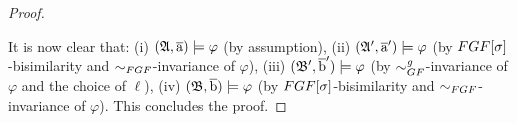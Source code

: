 \begin{proof}
\begin{figure}[H]
  \label{fig:fgf-to-gf-upgrade}
\end{figure}

It is now clear that: 
(i) $({\mathfrak{A}}, \overline{\mathrm{a}}) \models \varphi$ (by assumption),
(ii) $({\mathfrak{A}}', \overline{\mathrm{a}}') \models \varphi$ (by $\FGF[\sigma]$-bisimilarity and $\bisimto_{\FGF}$-invariance of $\varphi$),
(iii) $({\mathfrak{B}}', \overline{\mathrm{b}}') \models \varphi$ (by $\bisimto_{\GF}^{\mathit{g}}$-invariance of $\varphi$ and the choice of $\ell$),
(iv) $({\mathfrak{B}}, \overline{\mathrm{b}}) \models \varphi$ (by $\FGF[\sigma]$-bisimilarity and $\bisimto_{\FGF}$-invariance of $\varphi$). 
This concludes the proof.
\end{proof}




